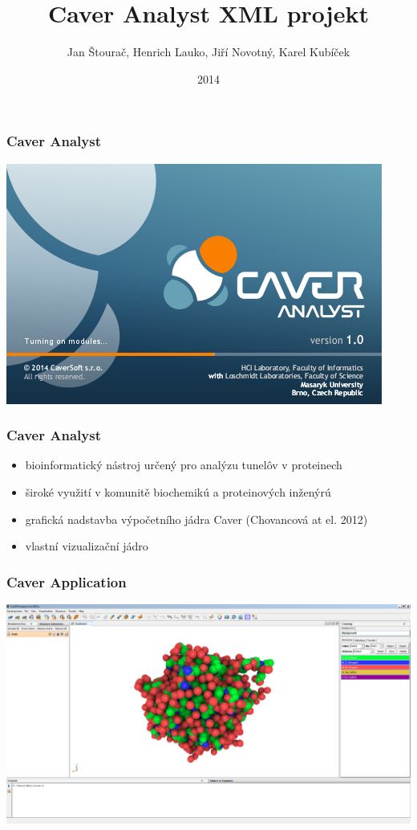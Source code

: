 \documentclass[slovak]{beamer}
\title{Caver Analyst XML projekt}
\date{2014}
\author{
	Jan Štourač, Henrich Lauko, Jiří Novotný, Karel Kubíček
}
\begin{document}
\begin{frame}
	\titlepage
\end{frame}

\begin{frame}
\frametitle{Caver Analyst}
	\includegraphics[width=\linewidth]{caver_start.jpg}
\end{frame}

\begin{frame}
\frametitle{Caver Analyst}
	\begin{itemize}
		\item bioinformatický nástroj určený pro analýzu tunelôv v proteinech
		\item široké využití v komunitě biochemikú a proteinových inženýrú 
		\item grafická nadstavba výpočetního jádra Caver (Chovancová at el. 2012)
		\item vlastní vizualizační jádro
	\end{itemize}
\end{frame}

\begin{frame}
\frametitle{Caver Application}
	\begin{center}
		\includegraphics[width=\linewidth]{caver.png}
	\end{center}
\end{frame}
\end{document}
